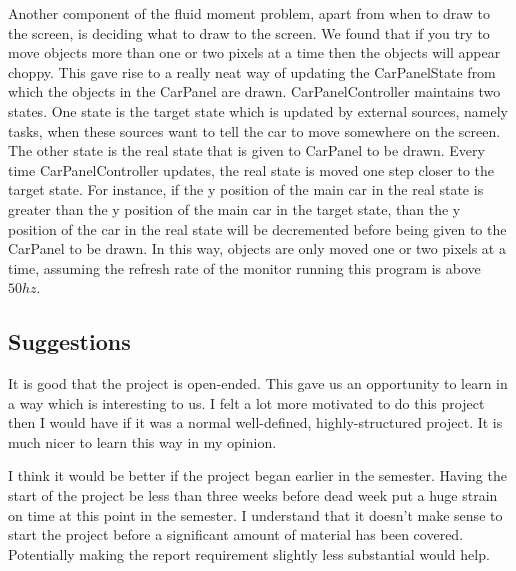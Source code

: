 \documentclass{article} %
\begin{document}
Another component of the fluid moment problem, apart from when to draw to the screen, is deciding what to draw to the screen.
We found that if you try to move objects more than one or two pixels at a time then the objects will appear choppy.
This gave rise to a really neat way of updating the CarPanelState from which the objects in the CarPanel are drawn.
CarPanelController maintains two states. 
One state is the target state which is updated by external sources, namely tasks, when these sources want to tell the car to move somewhere on the screen.
The other state is the real state that is given to CarPanel to be drawn.
Every time CarPanelController updates, the real state is moved one step closer to the target state.
For instance, 
if the y position of the main car in the real state is greater than the y position of the main car in the target state, 
than the y position of the car in the real state will be decremented before being given to the CarPanel to be drawn.
In this way, objects are only moved one or two pixels at a time, assuming the refresh rate of the monitor running this program is above $50hz$.

\subsection{Suggestions}
It is good that the project is open-ended.
This gave us an opportunity to learn in a way which is interesting to us.
I felt a lot more motivated to do this project then I would have if it was a normal well-defined, highly-structured project.
It is much nicer to learn this way in my opinion.

I think it would be better if the project began earlier in the semester.
Having the start of the project be less than three weeks before dead week put a huge strain on time at this point in the semester.
I understand that it doesn't make sense to start the project before a significant amount of material has been covered.
Potentially making the report requirement slightly less substantial would help.



\end{document}

